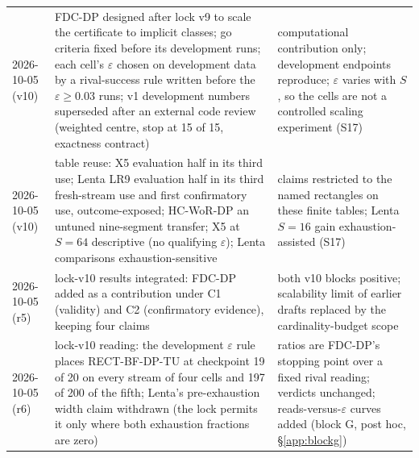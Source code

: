 \documentclass[sigconf,anonymous,review]{acmart}
\newcommand{\eps}{\varepsilon}
\begin{document}
\begin{table}[p]
\begin{tabular}{@{}l>{\raggedright\arraybackslash}p{6.6cm}>{\raggedright\arraybackslash}p{7.6cm}@{}}
2026-10-05 (v10) & FDC-DP designed after lock v9 to scale the certificate to implicit classes; go criteria fixed before its development runs; each cell's $\eps$ chosen on development data by a rival-success rule written before the $\eps \ge 0.03$ runs; v1 development numbers superseded after an external code review (weighted centre, stop at 15 of 15, exactness contract) & computational contribution only; development endpoints reproduce; $\eps$ varies with $S$, so the cells are not a controlled scaling experiment (S17) \\
2026-10-05 (v10) & table reuse: X5 evaluation half in its third use; Lenta LR9 evaluation half in its third fresh-stream use and first confirmatory use, outcome-exposed; HC-WoR-DP an untuned nine-segment transfer; X5 at $S = 64$ descriptive (no qualifying $\eps$); Lenta comparisons exhaustion-sensitive & claims restricted to the named rectangles on these finite tables; Lenta $S = 16$ gain exhaustion-assisted (S17) \\
2026-10-05 (r5) & lock-v10 results integrated: FDC-DP added as a contribution under C1 (validity) and C2 (confirmatory evidence), keeping four claims & both v10 blocks positive; scalability limit of earlier drafts replaced by the cardinality-budget scope \\
2026-10-05 (r6) & lock-v10 reading: the development $\eps$ rule places RECT-BF-DP-TU at checkpoint 19 of 20 on every stream of four cells and 197 of 200 of the fifth; Lenta's pre-exhaustion width claim withdrawn (the lock permits it only where both exhaustion fractions are zero) & ratios are FDC-DP's stopping point over a fixed rival reading; verdicts unchanged; reads-versus-$\eps$ curves added (block G, post hoc, \S\ref{app:blockg}) \\
\bottomrule
\end{tabular}
\end{table}
\end{document}
